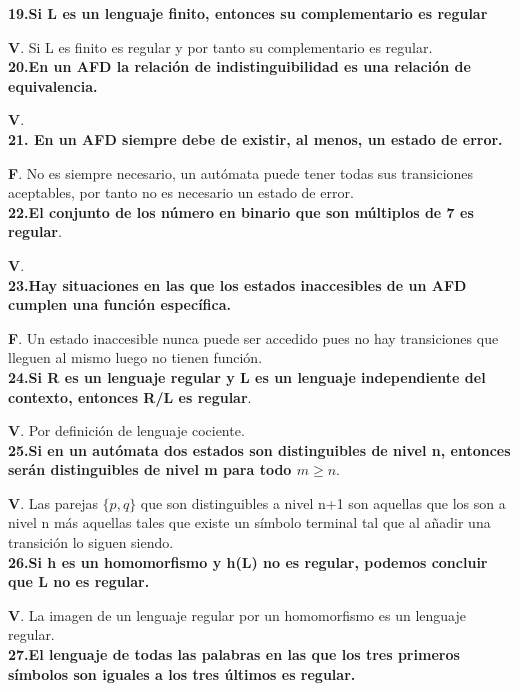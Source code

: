 \documentclass[a4paper,11pt]{article}
\begin{document}
\textbf{19.Si L es un lenguaje finito, entonces su complementario es regular}

\textbf{V}. Si L es finito es regular y por tanto su complementario es regular. \\

\textbf{20.En un AFD la relación de indistinguibilidad es una relación de equivalencia.}

\textbf{V}. \\

\textbf{21. En un AFD siempre debe de existir, al menos, un estado de error.}

\textbf{F}. No es siempre necesario, un autómata puede tener todas sus transiciones aceptables, por tanto no es necesario un estado de error. \\

\textbf{22.El conjunto de los número en binario que son múltiplos de 7 es regular}.

\textbf{V}. \\

\textbf{23.Hay situaciones en las que los estados inaccesibles de un AFD cumplen una función específica.}

\textbf{F}. Un estado inaccesible nunca puede ser accedido pues no hay transiciones que lleguen al mismo luego no tienen función. \\

\textbf{24.Si R es un lenguaje regular y L es un lenguaje independiente del contexto, entonces R/L es regular}.

\textbf{V}. Por definición de lenguaje cociente. \\

\textbf{25.Si en un autómata dos estados son distinguibles de nivel n, entonces serán distinguibles de nivel m para todo $m \geq n$}.

\textbf{V}. Las parejas $\{p,q\}$ que son distinguibles a nivel n+1 son aquellas que los son a nivel n más aquellas tales que existe un símbolo terminal tal que al añadir una transición lo siguen siendo. \\

\textbf{26.Si h es un homomorfismo y h(L) no es regular, podemos concluir que L no es regular.}

\textbf{V}. La imagen de un lenguaje regular por un homomorfismo es un lenguaje regular. \\

\textbf{27.El lenguaje de todas las palabras en las que los tres primeros símbolos son iguales a los tres últimos es regular.}
\end{document}
